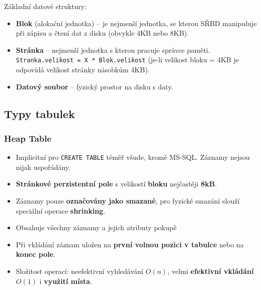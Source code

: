 Základní datové struktury:
\begin{itemize}
\item \textbf{Blok} (alokační jednotka) -- je nejmenší jednotka, se kterou SŘBD manipuluje při zápisu a čtení dat z disku (obvykle 4KB nebo 8KB).
\item \textbf{Stránka} -- nejmenší jednotka s kterou pracuje správce paměti. \texttt{Stranka.velikost = X * Blok.velikost} (je-li velikost bloku = 4KB je odpovídá velikost stránky násobkům 4KB).
\item \textbf{Datový soubor} -- fyzický prostor na disku s daty.
\end{itemize}


\subsection{Typy tabulek}
\subsubsection{Heap Table}
\begin{itemize}
\item Implicitní pro \texttt{CREATE TABLE} téměř všude, kromě MS-SQL. Záznamy nejsou nijak uspořádány.
\item \textbf{Stránkové perzistentní pole} s velikostí \textbf{bloku} nejčastěji \textbf{8kB}.
\item Záznamy pouze \textbf{označovány jako smazané}, pro fyzické smazání slouží speciální operace \textbf{shrinking}.
\item Obsahuje všechny záznamy a jejich atributy pokupě
\item Při vkládání záznam uložen na \textbf{první volnou pozici v tabulce} nebo na \textbf{konec pole}.
\item Složitost operací: neefektivní vyhledávání $O(n)$, velmi \textbf{efektivní vkládání} $O(1)$ i \textbf{využití místa}.
\end{itemize}
